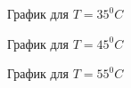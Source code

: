 \documentclass[a4paper, 12pt]{article}%
\begin{document}
\begin{enumerate}
\begin{figure}[h]
\caption{График для $T = 35 ^0 C$}
\end{figure}
\FloatBarrier
\FloatBarrier
\begin{figure}[h]
\caption{График для $T = 45 ^0 C$}
\end{figure}
\FloatBarrier
\FloatBarrier
\begin{figure}[h]
\caption{График для $T = 55 ^0 C$}
\end{figure}
\FloatBarrier
\FloatBarrier
\begin{figure}[h]

\end{figure}
\end{enumerate}
\end{document}
